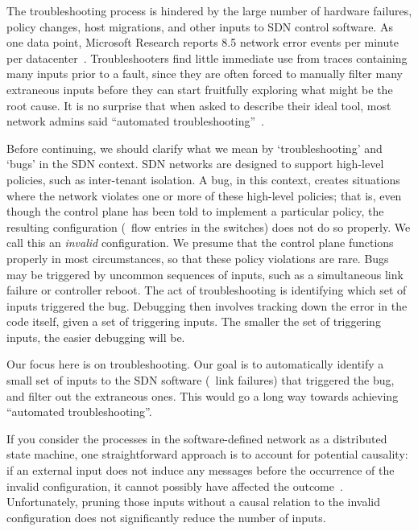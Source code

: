 The troubleshooting process is hindered by the large number of hardware failures,
policy changes, host migrations, and other inputs to SDN control software.
As one data point, Microsoft Research
reports 8.5 network error events per minute per
datacenter~\cite{Greenberg:2009:VSF:1592568.1592576}.
Troubleshooters find little immediate use from traces containing many inputs
prior to a fault,
since they are often forced to manually filter many extraneous inputs
before they can start fruitfully exploring what might be the root cause.
It is no surprise that when asked to describe their
ideal tool, most network admins said ``automated troubleshooting''~\cite{Zeng:Survey}.


Before continuing, we should clarify what we mean by `troubleshooting' and `bugs' in the SDN context.
SDN networks are designed to support high-level policies, such as inter-tenant
isolation. A bug, in this context, creates situations
where the network violates one or more of these high-level policies; that is, even though the control plane
has been told to implement a particular policy, the resulting configuration (\ie~flow entries in the switches)
does not do so properly. We call this an {\em invalid} configuration.
We presume that the control plane functions properly in most circumstances, so
that these policy violations are rare.
Bugs may be triggered by uncommon sequences of inputs, such as a simultaneous link failure or controller reboot.
The act of troubleshooting is identifying which set of inputs triggered the bug.
Debugging then involves tracking down the error in the code itself, given a
set of triggering inputs.
The smaller the set of triggering inputs, the easier debugging will be.

Our focus here is on troubleshooting. Our goal is
to automatically identify a small set of inputs to the SDN software (\eg~link failures) that
triggered the bug, and filter out the extraneous ones. This would go a long way towards achieving ``automated troubleshooting''.

If you consider the processes in the software-defined network as a distributed
state machine, one straightforward approach is
to account for potential causality: if an external input does not induce any messages before
the occurrence of the invalid configuration, it
cannot possibly have affected the outcome~\cite{Lamport:1978:TCO:359545.359563}.
Unfortunately, pruning those inputs without a causal relation to
the invalid configuration does not
significantly reduce the number of inputs.

